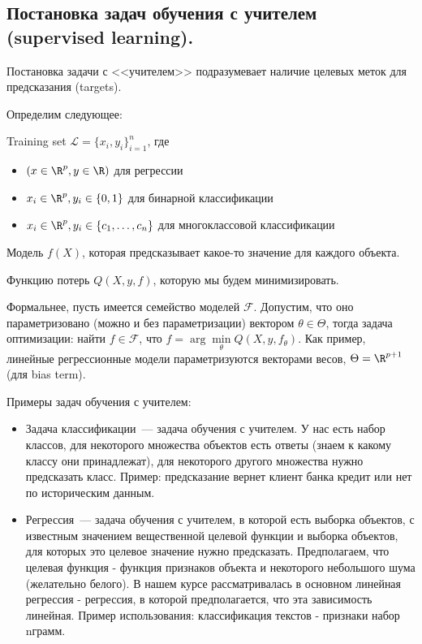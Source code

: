 \subsection{Постановка задач обучения с учителем (supervised learning).}

\Note Постановка задачи с <<учителем>> подразумевает наличие целевых меток для предсказания (targets).

Определим следующее:

\Def Training set $\mathcal{L} = \{ x_i, y_i \}_{i=1}^{n}$, где

\begin{itemize}
    \item $(x \in \R^p, y \in \R)$ для регрессии
    \item $x_i \in \R^p, y_i \in \{ 0, 1 \}$ для бинарной классификации
    \item $x_i \in \R^p, y_i \in \{ c_1, \ldots, c_n \}$ для многоклассовой классификации
\end{itemize}

\Def Модель $f(X)$, которая предсказывает какое-то значение для каждого объекта.

\Def Функцию потерь $Q(X,y,f)$, которую мы будем минимизировать.

\Note Формальнее, пусть имеется семейство моделей $\mathcal{F}$. Допустим, что оно параметризовано (можно и без параметризации) вектором $\theta \in \Theta$, тогда задача оптимизации: найти $f \in \mathcal{F}$, что $f = \arg\min\limits_{\theta} Q(X, y, f_\theta)$. Как пример, линейные регрессионные модели параметризуются векторами весов, $\Theta = \R^{p + 1}$ (для bias term). 

Примеры задач обучения с учителем:

\begin{itemize}
    \item Задача классификации~--- задача обучения с учителем. У нас есть набор классов, для некоторого множества объектов есть ответы (знаем к какому классу они принадлежат), для некоторого другого множества нужно предсказать класс. Пример: предсказание вернет клиент банка кредит или нет по историческим данным.
    \item Регрессия~--- задача обучения с учителем, в которой есть выборка объектов, с известным значением вещественной целевой функции и выборка объектов, для которых это целевое значение нужно предсказать. Предполагаем, что целевая функция - функция признаков объекта и некоторого небольшого шума (желательно белого). В нашем курсе рассматривалась в основном линейная регрессия - регрессия, в которой предполагается, что эта зависимость линейная. Пример использования: классификация текстов - признаки набор nграмм.
\end{itemize}


